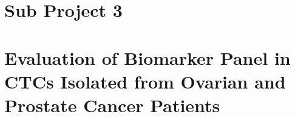 \documentclass[10pt,hyperref,normalmargins]{ucdthesis}
\begin{document}
\chapter{Sub Project 3}

\chapter{Evaluation of Biomarker Panel in CTCs Isolated from Ovarian and Prostate Cancer Patients}


\begin{postliminary}




\end{postliminary}
\end{document}
